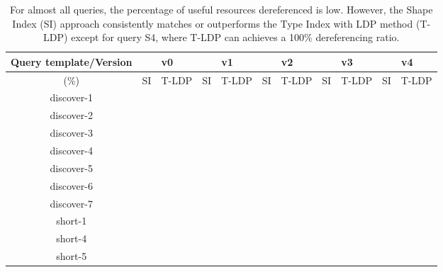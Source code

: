 \begin{table}[htbp]
	\begin{center}
		\begin{tabular}{|c|c|c|c|c|c|c|c|c|c|c|}
			\hline
            \multicolumn{1}{|c}{Query template/Version} & \multicolumn{2}{|c|}{v0} & \multicolumn{2}{|c|}{v1} & \multicolumn{2}{|c|}{v2} & \multicolumn{2}{|c|}{v3} & \multicolumn{2}{|c|}{v4} \\
			\hline
            (\%) & SI  & T-LDP & SI & T-LDP & SI & T-LDP& SI & T-LDP & SI & T-LDP \\
            \hline
			discover-1 & {} & {} & {} & {} & {} & {} & {} & {} & {} & {} \\
            \hline
            discover-2 & {} & {} & {} & {} & {} & {} & {} & {} & {} & {} \\
			\hline
            discover-3 & {} & {} & {} & {} & {} & {} & {} & {} & {} & {} \\
			\hline
            discover-4 & {} & {} & {} & {} & {} & {} & {} & {} & {} & {} \\
			\hline
            discover-5 & {} & {} & {} & {} & {} & {} & {} & {} & {} & {} \\
			\hline
            discover-6 & {} & {} & {} & {} & {} & {} & {} & {} & {} & {} \\
			\hline
            discover-7 & {} & {} & {} & {} & {} & {} & {} & {} & {} & {} \\
			\hline
            short-1 & {} & {} & {} & {} & {} & {} & {} & {} & {} & {} \\
			\hline
            short-4 & {} & {} & {} & {} & {} & {} & {} & {} & {} & {} \\
			\hline
            short-5 & {} & {} & {} & {} & {} & {} & {} & {} & {} & {} \\
			\hline
		\end{tabular}
	\end{center}
	\caption{
        For almost all queries, the percentage of useful resources dereferenced is low. 
        However, the Shape Index (SI) approach consistently matches or outperforms the Type Index with LDP method (T-LDP) except for query S4, where T-LDP can achieves a 100\% dereferencing ratio.
        }
	\label{tab:ratioUsefulResources}
\end{table}